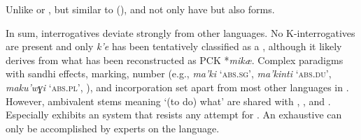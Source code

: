 \noindent Unlike  or , but similar to  (),  and  not only have  but also  forms.

In sum,  interrogatives deviate strongly from other  languages. No K-interrogatives are present and only  \textit{k’e} has been tentatively classified as a , although it likely derives from what has been reconstructed as PCK *\textit{mikæ}. Complex paradigms with sandhi effects,  marking,  number (e.g.,  \textit{ma’ki} ‘\textsc{abs.sg}’, \textit{ma’kinti} ‘\textsc{abs.du}’, \textit{maku’wɣi} ‘\textsc{abs.pl}’, \citealt{Bogoras1922}), and incorporation set  apart from most other languages in . However, ambivalent  stems meaning ‘(to do) what’ are shared with , , and . Especially  exhibits an   system that resists any  attempt for . An exhaustive   can only be accomplished by experts on the language.